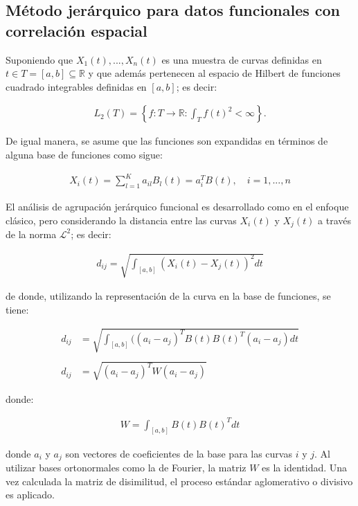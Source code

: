 \documentclass[
]{book}
\begin{document}
\hypertarget{muxe9todo-jeruxe1rquico-para-datos-funcionales-con-correlaciuxf3n-espacial}{%
\subsection{Método jerárquico para datos funcionales con correlación espacial}\label{muxe9todo-jeruxe1rquico-para-datos-funcionales-con-correlaciuxf3n-espacial}}

Suponiendo que \(X_1(t),...,X_n(t)\) es una muestra de curvas definidas en \(t\in T=[a,b]\subseteq \mathbb{R}\) y que además pertenecen al espacio de Hilbert de funciones cuadrado integrables definidas en \([a,b]\); es decir:

\begin{align*}
    L_2(T)=\left\{f: T\to \mathbb{R}: \int_Tf(t)^2<\infty \right\}.
\end{align*}

De igual manera, se asume que las funciones son expandidas en términos de alguna base de funciones como sigue:

\begin{align*}
    X_i(t)=\sum_{l=1}^Ka_{il}B_l(t)=a_i^TB(t),\quad i=1,...,n
\end{align*}

El análisis de agrupación jerárquico funcional es desarrollado como en el enfoque clásico, pero considerando la distancia entre las curvas \(X_i(t)\) y \(X_j(t)\) a través de la norma \(\mathcal{L}^2\); es decir:

\begin{align*}
    d_{ij}=\sqrt{\int_{[a,b]} (X_{i}(t)-X_{j}(t))^2 dt}
\end{align*}

de donde, utilizando la representación de la curva en la base de funciones, se tiene:

\begin{align*}
    d_{ij}&=\sqrt{\int_{[a,b]} ((a_i - a_j)^T B(t)B(t)^T (a_i - a_j) dt}\\\\
   d_{ij} &=\sqrt{(a_i-a_j)^T W (a_i - a_j)}
\end{align*}

donde:

\begin{align*}
    W=\int_{[a,b]}B(t)B(t)^Tdt
\end{align*}

donde \(a_i\) y \(a_j\) son vectores de coeficientes de la base para las curvas \(i\) y \(j\). Al utilizar bases ortonormales como la de Fourier, la matriz \(W\) es la identidad. Una vez calculada la matriz de disimilitud, el proceso estándar aglomerativo o divisivo es aplicado.
\end{document}
